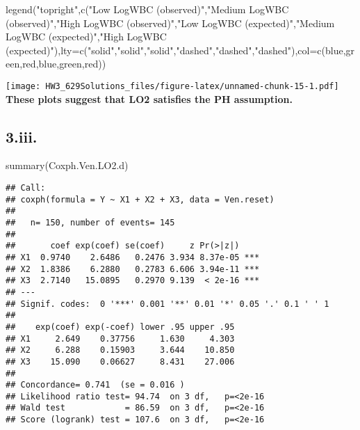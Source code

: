 \documentclass[
]{article}
\newenvironment{Shaded}{\begin{snugshade}}{\end{snugshade}}
\newcommand{\AttributeTok}[1]{\textcolor[rgb]{0.77,0.63,0.00}{#1}}
\newcommand{\FunctionTok}[1]{\textcolor[rgb]{0.00,0.00,0.00}{#1}}
\newcommand{\NormalTok}[1]{#1}
\newcommand{\StringTok}[1]{\textcolor[rgb]{0.31,0.60,0.02}{#1}}
\begin{document}
\begin{Shaded}
\begin{Highlighting}[]
\FunctionTok{legend}\NormalTok{(}\StringTok{"topright"}\NormalTok{,}\FunctionTok{c}\NormalTok{(}\StringTok{"Low LogWBC (observed)"}\NormalTok{,}\StringTok{"Medium LogWBC (observed)"}\NormalTok{,}\StringTok{"High LogWBC (observed)"}\NormalTok{,}\StringTok{"Low LogWBC (expected)"}\NormalTok{,}\StringTok{"Medium LogWBC (expected)"}\NormalTok{,}\StringTok{"High LogWBC (expected)"}\NormalTok{),}\AttributeTok{lty=}\FunctionTok{c}\NormalTok{(}\StringTok{"solid"}\NormalTok{,}\StringTok{"solid"}\NormalTok{,}\StringTok{"solid"}\NormalTok{,}\StringTok{"dashed"}\NormalTok{,}\StringTok{"dashed"}\NormalTok{,}\StringTok{"dashed"}\NormalTok{),}\AttributeTok{col=}\FunctionTok{c}\NormalTok{(}\StringTok{\textquotesingle{}blue\textquotesingle{}}\NormalTok{,}\StringTok{\textquotesingle{}green\textquotesingle{}}\NormalTok{,}\StringTok{\textquotesingle{}red\textquotesingle{}}\NormalTok{,}\StringTok{\textquotesingle{}blue\textquotesingle{}}\NormalTok{,}\StringTok{\textquotesingle{}green\textquotesingle{}}\NormalTok{,}\StringTok{\textquotesingle{}red\textquotesingle{}}\NormalTok{))}
\end{Highlighting}
\end{Shaded}

\texttt{[image: HW3\_629Solutions\_files/figure-latex/unnamed-chunk-15-1.pdf]}
\textbf{These plots suggest that LO2 satisfies the PH assumption.}

\hypertarget{iii.}{%
\subsection{3.iii.}\label{iii.}}

\begin{Shaded}
\begin{Highlighting}[]
\FunctionTok{summary}\NormalTok{(Coxph.Ven.LO2.d)}
\end{Highlighting}
\end{Shaded}

\begin{verbatim}
## Call:
## coxph(formula = Y ~ X1 + X2 + X3, data = Ven.reset)
## 
##   n= 150, number of events= 145 
## 
##       coef exp(coef) se(coef)     z Pr(>|z|)    
## X1  0.9740    2.6486   0.2476 3.934 8.37e-05 ***
## X2  1.8386    6.2880   0.2783 6.606 3.94e-11 ***
## X3  2.7140   15.0895   0.2970 9.139  < 2e-16 ***
## ---
## Signif. codes:  0 '***' 0.001 '**' 0.01 '*' 0.05 '.' 0.1 ' ' 1
## 
##    exp(coef) exp(-coef) lower .95 upper .95
## X1     2.649    0.37756     1.630     4.303
## X2     6.288    0.15903     3.644    10.850
## X3    15.090    0.06627     8.431    27.006
## 
## Concordance= 0.741  (se = 0.016 )
## Likelihood ratio test= 94.74  on 3 df,   p=<2e-16
## Wald test            = 86.59  on 3 df,   p=<2e-16
## Score (logrank) test = 107.6  on 3 df,   p=<2e-16
\end{verbatim}
\end{document}
